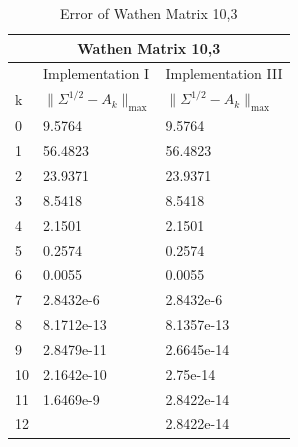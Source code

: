 \begin{table}
\begin{center}
\label{Table: Wathen 10,3}
\begin{tabular}{| l | l | l | }

	\hline
	\multicolumn{3}{|c|}{Wathen Matrix 10,3}  \\
	\hline
	   & Implementation I & Implementation III \\
	k & $\parallel \Sigma^{1/2} - A_{k}\parallel_{\text{max}}$ & $\parallel \Sigma^{1/2} - A_{k}\parallel_{\text{max}}$  \\	
	\hline
	0 & 9.5764 & 9.5764 \\
	1 & 56.4823& 56.4823  \\
	2 & 23.9371& 23.9371   \\
	3 & 8.5418& 8.5418 \\
	4 & 2.1501& 2.1501  \\
	5 & 0.2574& 0.2574  \\
	6 & 0.0055& 0.0055  \\
	7 & 2.8432e-6& 2.8432e-6  \\
	8 & 8.1712e-13& 8.1357e-13  \\
	9 & 2.8479e-11& 2.6645e-14  \\
	10& 2.1642e-10 & 2.75e-14 \\ 
	11& 1.6469e-9 & 2.8422e-14\\
	12& & 2.8422e-14 \\
	\hline
	
\end{tabular}
\caption{Error of Wathen Matrix 10,3}
\end{center}
\end{table}


